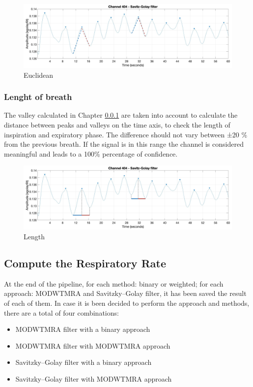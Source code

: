 \begin{figure}[H]
    \centering
    \includegraphics[width=\textwidth]{img/euclidian.png}
    \caption{Euclidean}
    \label{fig:Euclidean}
\end{figure}
\vspace*{0.3cm}

\subsubsection{Lenght of breath} \label{cap:BrethLength}
The valley calculated in Chapter \ref{cap:BrethLength} are taken into account to calculate the distance between peaks and valleys on the time axis, to check the length of inspiration and expiratory phase. The difference should not vary between ±20 \% from the previous breath. If the signal is in this range the channel is considered meaningful and leads to a 100\% percentage of confidence.\\
\vspace*{0.5cm}

\begin{figure}[H]
    \centering
    \includegraphics[width=\textwidth]{img/x_axis.png}
    \caption{Length}
    \label{fig:lenght}
\end{figure}
\vspace*{0.3cm}

\subsection{Compute the Respiratory Rate}

At the end of the pipeline, for each method: binary or weighted; for each approach: MODWTMRA and Savitzky–Golay filter, it has been saved the result of each of them. In case it is been decided to perform the approach and methods, there are a total of four combinations:
\begin{itemize}
    \item MODWTMRA filter with a binary approach
    \item MODWTMRA filter with MODWTMRA approach
    \item Savitzky–Golay filter with a binary approach
    \item Savitzky–Golay filter with MODWTMRA approach   
\end{itemize}


